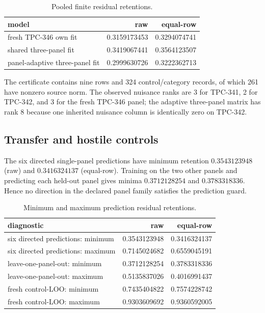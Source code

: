 \documentclass[10pt]{article}
\begin{document}
\begin{table}[t]
\centering
\small
\caption{Pooled finite residual retentions.}
\label{tab:models}
\begin{tabular}{@{}lrr@{}}
\toprule
model & raw & equal-row\\
\midrule
fresh TPC-346 own fit & 0.3159173453 & 0.3294074741\\
shared three-panel fit & 0.3419067441 & 0.3564123507\\
panel-adaptive three-panel fit & 0.2999630726 & 0.3222362713\\
\bottomrule
\end{tabular}
\end{table}

The certificate contains nine rows and 324 control/category records, of
which 261 have nonzero source norm.  The observed nuisance ranks are 3 for
TPC-341, 2 for TPC-342, and 3 for the fresh TPC-346 panel; the adaptive
three-panel matrix has rank 8 because one inherited nuisance column is
identically zero on TPC-342.

\subsection{Transfer and hostile controls}

The six directed single-panel predictions have minimum retention
$0.3543123948$ (raw) and $0.3416324137$ (equal-row).  Training on the two
other panels and predicting each held-out panel gives minima
$0.3712128254$ and $0.3783318336$.  Hence no direction in the declared
panel family satisfies the prediction guard.

\begin{table}[t]
\centering
\small
\caption{Minimum and maximum prediction residual retentions.}
\label{tab:transfer}
\begin{tabular}{@{}lrr@{}}
\toprule
diagnostic & raw & equal-row\\
\midrule
six directed predictions: minimum & 0.3543123948 & 0.3416324137\\
six directed predictions: maximum & 0.7145024682 & 0.6559045191\\
leave-one-panel-out: minimum & 0.3712128254 & 0.3783318336\\
leave-one-panel-out: maximum & 0.5135837026 & 0.4016991437\\
fresh control-LOO: minimum & 0.7435404822 & 0.7574228742\\
fresh control-LOO: maximum & 0.9303609692 & 0.9360592005\\
\bottomrule
\end{tabular}
\end{table}
\end{document}
